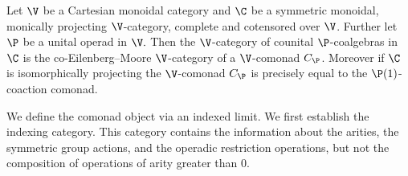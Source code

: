 \documentclass{tac}
\begin{document}
 \begin{theorem}
 \label{thm:big}
    Let $\V$ be a Cartesian monoidal category and $\C$ be a symmetric monoidal, monically projecting $\V$-category, complete and cotensored over $\V$. Further let $\P$ be a unital operad in $\V.$ Then the $\V$-category of counital $\P$-coalgebras in $\C$ is the co-Eilenberg--Moore $\V$-category of a $\V$-comonad $C_\P$. Moreover if $\C$ is isomorphically projecting the $\V$-comonad $C_\P$ is precisely equal to the $\P(1)$-coaction comonad.
\end{theorem}





We define the comonad object via an indexed limit. We first establish the indexing category. This category contains the information about the arities, the symmetric group actions, and the operadic restriction operations, but not the composition of operations of arity greater than 0.
\end{document}
